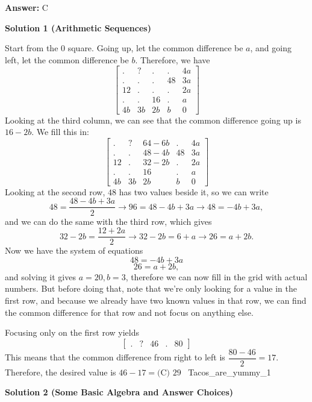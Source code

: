 \begin{enumerate}
 \textbf{Answer: }C



\textbf{Solution 1 (Arithmetic Sequences)}

Start from the $0$ square. Going up, let the common difference be $a$, and going left, let the common difference be $b$. Therefore, we have 
 \[\begin{bmatrix} . & ? &.&.&4a \\ .&.&.&48&3a\\ 12&.&.&.&2a\\ .&.&16&.&a\\ 4b&3b&2b&b&0\end{bmatrix}\] Looking at the third column, we can see that the common difference going up is $16-2b$. We fill this in: 
 \[\begin{bmatrix} . & ? &64-6b&.&4a \\ .&.&48-4b&48&3a\\ 12&.&32-2b&.&2a\\ .&.&16&.&a\\ 4b&3b&2b&b&0\end{bmatrix}\] Looking at the second row, $48$ has two values beside it, so we can write 
 \[48=\dfrac{48-4b+3a}{2}\rightarrow96=48-4b+3a\rightarrow48=-4b+3a,\] and we can do the same with the third row, which gives 
 \[32-2b=\dfrac{12+2a}{2}\rightarrow32-2b=6+a\rightarrow26=a+2b.\] Now we have the system of equations 
 \[48=-4b+3a\]
 \[26=a+2b,\] and solving it gives $a=20,b=3$, therefore we can now fill in the grid with actual numbers. But before doing that, note that we're only looking for a value in the first row, and because we already have two known values in that row, we can find the common difference for that row and not focus on anything else. 

 Focusing only on the first row yields 
 \[\begin{bmatrix} . & ? &46&.&80\end{bmatrix}\] This means that the common difference from right to left is $\dfrac{80-46}{2}=17$. Therefore, the desired value is $46-17=\boxed{\text{(C) }29}$ ~Tacos\_are\_yummy\_1

 



\textbf{Solution 2 (Some Basic Algebra and Answer Choices)}


\end{enumerate}
